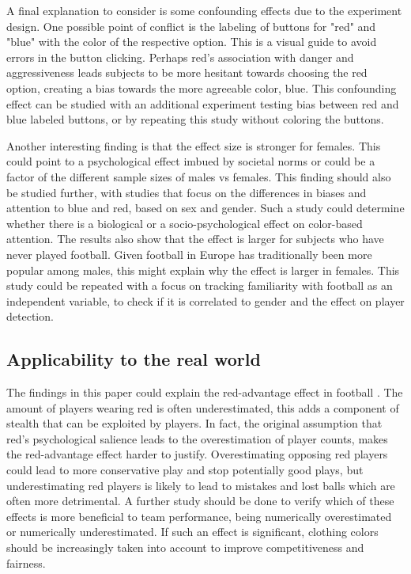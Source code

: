 A final explanation to consider is some confounding effects due to the experiment design. One possible point of conflict is the labeling of buttons for "red" and "blue" with the color of the respective option. This is a visual guide to avoid errors in the button clicking. Perhaps red's association with danger and aggressiveness leads subjects to be more hesitant towards choosing the red option, creating a bias towards the more agreeable color, blue. This confounding effect can be studied with an additional experiment testing bias between red and blue labeled buttons, or by repeating this study without coloring the buttons.

Another interesting finding is that the effect size is stronger for females. This could point to a psychological effect imbued by societal norms or could be a factor of the different sample sizes of males vs females. This finding should also be studied further, with studies that focus on the differences in biases and attention to blue and red, based on sex and gender. Such a study could determine whether there is a biological or a socio-psychological effect on color-based attention. The results also show that the effect is larger for subjects who have never played football. Given football in Europe has traditionally been more popular among males, this might explain why the effect is larger in females. This study could be repeated with a focus on tracking familiarity with football as an independent variable, to check if it is correlated to gender and the effect on player detection.


\subsection{Applicability to the real world}
The findings in this paper could explain the red-advantage effect in football \cite{english}. The amount of players wearing red is often underestimated, this adds a component of stealth that can be exploited by players. In fact, the original assumption that red's psychological salience leads to the overestimation of player counts, makes the red-advantage effect harder to justify. Overestimating opposing red players could lead to more conservative play and stop potentially good plays, but underestimating red players is likely to lead to mistakes and lost balls which are often more detrimental. A further study should be done to verify which of these effects is more beneficial to team performance, being numerically overestimated or numerically underestimated. If such an effect is significant, clothing colors should be increasingly taken into account to improve competitiveness and fairness.

